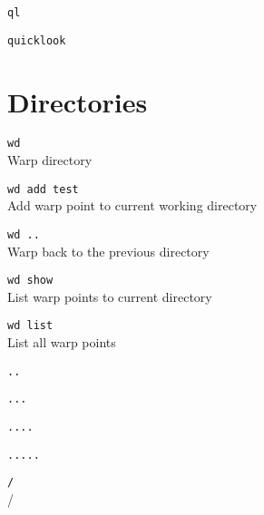 \documentclass[a4paper,landscape,columns=3]{cheatsheet}
\begin{document}
\texttt{ql}\\
{}

\texttt{quicklook}\\
{}

\section{Directories}

\texttt{wd}\\
Warp directory

\texttt{wd add test}\\
Add warp point to current working directory

\texttt{wd ..}\\
Warp back to the previous directory

\texttt{wd show}\\
List warp points to current directory

\texttt{wd list}\\
List all warp points

\texttt{..}\\
{}

\texttt{...}\\
{}

\texttt{....}\\
{}

\texttt{.....}\\
{}

\texttt{/}\\
{} /
\end{document}
